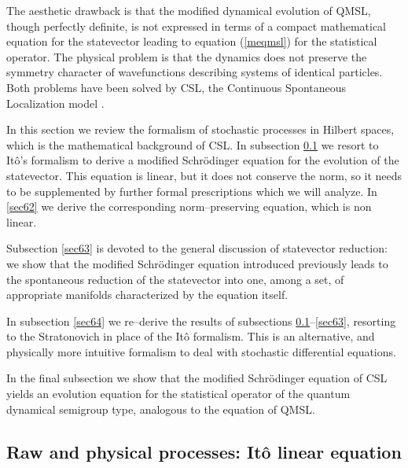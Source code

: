 \documentclass[10pt,a4paper]{article}
\begin{document}
The aesthetic drawback is that the modified dynamical evolution of
QMSL, though perfectly definite, is not expressed in terms of a
compact mathematical equation for the statevector leading to
equation (\ref{meqmsl}) for the statistical operator. The physical
problem is that the dynamics does not preserve the symmetry character of
wavefunctions describing systems of identical particles. Both problems
have been solved by CSL, the Continuous Spontaneous Localization model
\cite{csl0,csl}.

In this section we review the formalism of stochastic processes in
Hilbert spaces, which is the mathematical background of CSL. In
subsection \ref{sec61} we resort to  It\^o's formalism to derive
a modified Schr\"odinger equation for the evolution of the
statevector. This equation is linear, but it does not conserve the
norm, so it needs to be supplemented by further formal
prescriptions which we will analyze. In \ref{sec62} we derive the
corresponding norm--preserving equation, which is non linear.

Subsection \ref{sec63} is devoted to the general discussion of
statevector reduction: we show that the modified Schr\"odinger
equation introduced previously leads to the spontaneous reduction
of the statevector into one, among a set, of appropriate manifolds
characterized by the equation itself.

In subsection \ref{sec64} we re--derive the results of subsections
\ref{sec61}--\ref{sec63}, resorting to the Stratonovich in place
of the It\^o formalism. This is an alternative, and physically
more intuitive formalism to deal with stochastic differential
equations.

In the final subsection we show that the modified Schr\"odinger
equation of CSL yields an evolution equation for the statistical
operator of the quantum dynamical semigroup type, analogous to the
equation of QMSL.


\subsection{Raw and physical processes: It\^o linear equation}
\label{sec61}
\end{document}
